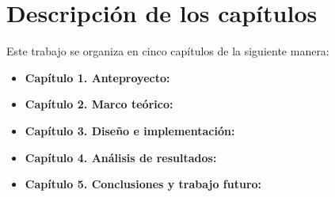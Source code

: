 \section{Descripción de los capítulos}
\label{section:desc}

Este trabajo se organiza en cinco capítulos de la siguiente manera:

\begin{itemize}
  \item \textbf{Capítulo 1. Anteproyecto:}
  \item \textbf{Capítulo 2. Marco teórico:}
  \item \textbf{Capítulo 3. Diseño e implementación:}
  \item \textbf{Capítulo 4. Análisis de resultados:}
  \item \textbf{Capítulo 5. Conclusiones y trabajo futuro:}
\end{itemize}